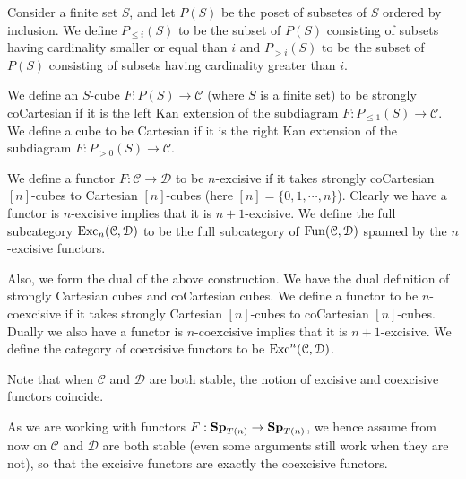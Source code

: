 	\begin{defn}\label{Exc_fun}
		Consider a finite set $S$, and let $P(S)$ be the poset of subsetes of $S$ ordered by inclusion. We define $P_{\leq i}(S)$ to be the subset of $P(S)$ consisting of subsets having cardinality smaller or equal than $i$ and $P_{>i}(S)$ to be the subset of $P(S)$ consisting of subsets having cardinality greater than $i$. 

		We define an $S$-cube $F:P(S)\to\mathcal{C}$ (where $S$ is a finite set) to be strongly coCartesian if it is the left Kan extension of the subdiagram $F:P_{\leq 1}(S)\to\mathcal{C}$. We define a cube to be Cartesian if it is the right Kan extension of the subdiagram $F:P_{>0}(S)\to\mathcal{C}$. 

		We define a functor $F:\mathcal{C}\to\mathcal{D}$ to be $n$-excisive if it takes strongly coCartesian $[n]$-cubes to Cartesian $[n]$-cubes (here $[n]=\{0,1,\cdots,n\}$). Clearly we have a functor is $n$-excisive implies that it is $n+1$-excisive. We define the full subcategory $\operatorname{\mathrm{Exc}}_n(\mathcal{C},\mathcal{D})$ to be the full subcategory of $\operatorname{\mathrm{Fun}}(\mathcal{C},\mathcal{D})$ spanned by the $n$-excisive functors. 

		Also, we form the dual of the above construction. We have the dual definition of strongly Cartesian cubes and coCartesian cubes. We define a functor to be $n$-coexcisive if it takes strongly Cartesian $[n]$-cubes to coCartesian $[n]$-cubes. Dually we also have a functor is $n$-coexcisive implies that it is $n+1$-excisive. We define the category of coexcisive functors to be $\operatorname{\mathrm{Exc}}^n(\mathcal{C},\mathcal{D})$. 

		Note that when $\mathcal{C}$ and $\mathcal{D}$ are both stable, the notion of excisive and coexcisive functors coincide. 
	\end{defn}

	As we are working with functors $F:\mathbf{Sp}_{T(n)}\to\mathbf{Sp}_{T(n)}$, we hence assume from now on $\mathcal{C}$ and $\mathcal{D}$ are both stable (even some arguments still work when they are not), so that the excisive functors are exactly the coexcisive functors. 

